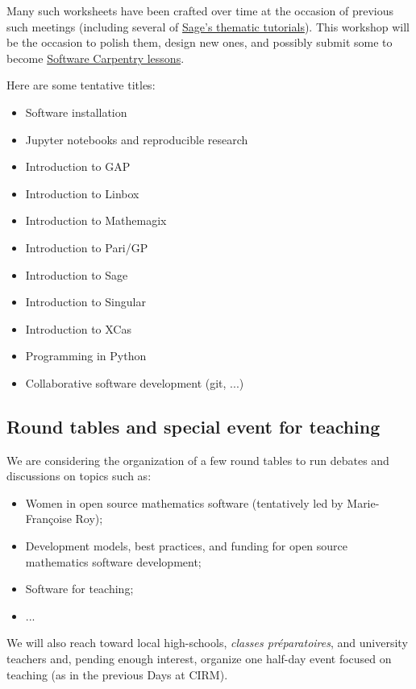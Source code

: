 \documentclass[12pt]{amsart}
\begin{document}
Many such worksheets have been crafted over time at the occasion of
previous such meetings (including several of
\href{http://doc.sagemath.org/html/en/thematic_tutorials/}{Sage's
  thematic tutorials}). This workshop will be the occasion to polish them,
design new ones, and possibly submit some to become
\href{http://software-carpentry.org/lessons/}{Software Carpentry lessons}.

Here are some tentative titles:
\begin{itemize}
\item Software installation
\item Jupyter notebooks and reproducible research
\item Introduction to GAP
\item Introduction to Linbox
\item Introduction to Mathemagix
\item Introduction to Pari/GP
\item Introduction to Sage
\item Introduction to Singular
\item Introduction to XCas
\item Programming in Python
\item Collaborative software development (git, ...)
\end{itemize}

\subsection{Round tables and special event for teaching}

We are considering the organization of a few round tables to run
debates and discussions on topics such as:

\begin{itemize}
\item Women in open source mathematics software (tentatively led by
  Marie-Françoise Roy);
\item Development models, best practices, and funding for open source
  mathematics software development;
\item Software for teaching;
\item ...
\end{itemize}

We will also reach toward local high-schools, \textit{classes préparatoires},
and university teachers and, pending enough interest, organize one
half-day event focused on teaching (as in the previous \Sage Days at
CIRM).
\end{document}
